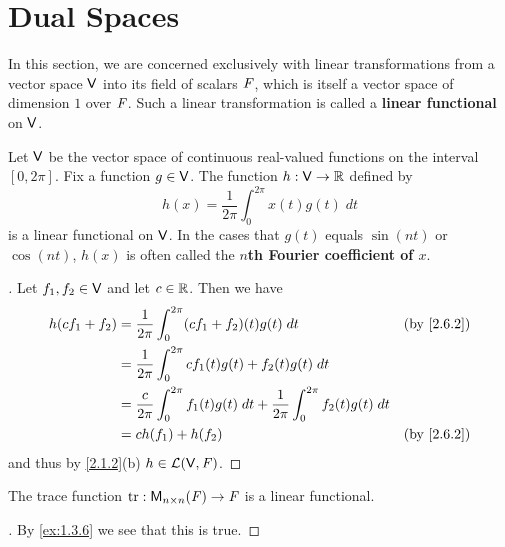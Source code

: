 \section{Dual Spaces}\label{sec:2.6}

\begin{defn}\label{2.6.1}
  In this section, we are concerned exclusively with linear transformations from a vector space \(\mathsf{V}\) into its field of scalars \(\mathit{F}\), which is itself a vector space of dimension \(1\) over \(\mathit{F}\).
  Such a linear transformation is called a \textbf{linear functional} on \(\mathsf{V}\).
\end{defn}

\begin{eg}\label{2.6.2}
  Let \(\mathsf{V}\) be the vector space of continuous real-valued functions on the interval \([0, 2 \pi]\).
  Fix a function \(g \in \mathsf{V}\).
  The function \(h : \mathsf{V} \to \mathbb{R}\) defined by
  \[
    h(x) = \frac{1}{2 \pi} \int_{0}^{2 \pi} x(t) g(t) \; dt
  \]
  is a linear functional on \(\mathsf{V}\).
  In the cases that \(g(t)\) equals \(\sin(nt)\) or \(\cos(nt)\), \(h(x)\) is often called the \textbf{\(n\)th Fourier coefficient of \(x\)}.
\end{eg}

\begin{proof}[]
  Let \(f_1, f_2 \in \mathsf{V}\) and let \(c \in \mathbb{R}\).
  Then we have
  \begin{align*}
    h(cf_1 + f_2) & = \frac{1}{2 \pi} \int_{0}^{2 \pi} (cf_1 + f_2)(t) g(t) \; dt                                             &  & \by{2.6.2} \\
                  & = \frac{1}{2 \pi} \int_{0}^{2 \pi} cf_1(t) g(t) + f_2(t) g(t) \; dt                                                       \\
                  & = \frac{c}{2 \pi} \int_{0}^{2 \pi} f_1(t) g(t) \; dt + \frac{1}{2 \pi} \int_{0}^{2 \pi} f_2(t) g(t) \; dt                 \\
                  & = c h(f_1) + h(f_2)                                                                                       &  & \by{2.6.2}
  \end{align*}
  and thus by \cref{2.1.2}(b) \(h \in \mathcal{L}(\mathsf{V}, \mathit{F})\).
\end{proof}

\begin{eg}\label{2.6.3}
  The trace function \(\tr : \ms[n][n][\F] \to \F\) is a linear functional.
\end{eg}

\begin{proof}[]
  By \cref{ex:1.3.6} we see that this is true.
\end{proof}

